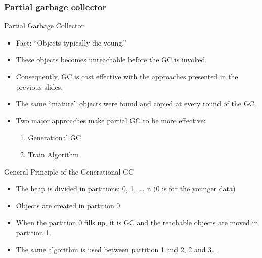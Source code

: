 \begin{bibunit}[apalike]
\subsubsection{Partial garbage collector}

\tableofcontentslide[sections={4-6},sectionstyle={show/shaded},subsectionstyle={show/shaded/hide},subsubsectionstyle={show/shaded/hide/hide}]

\begin{frame}{Partial Garbage Collector}
	\begin{itemize}
	\item Fact: ``Objects typically die young.''
	\item These objects becomes unreachable before the GC is invoked.
	\item Consequently, GC is cost effective with the approaches presented in the previous slides.
	\item The same ``mature'' objects were found and copied at every round of the GC.
	\vfill
	\item Two major approaches make partial GC to be more effective:
		\begin{enumerate}
		\item Generational GC
		\item Train Algorithm
		\end{enumerate}
	\end{itemize}
\end{frame}

\begin{frame}{General Principle of the Generational GC}
	\begin{itemize}
	\item The heap is divided in partitions: 0, 1, \dots, n (0 is for the younger data)
	\vfill
	\item Objects are created in partition 0.
	\vfill
	\item When the partition 0 fills up, it is GC and the reachable objects are moved in partition 1.
	\vfill
	\item The same algorithm is used between partition 1 and 2, 2 and 3\dots
	\end{itemize}
\end{frame}


\end{bibunit}
